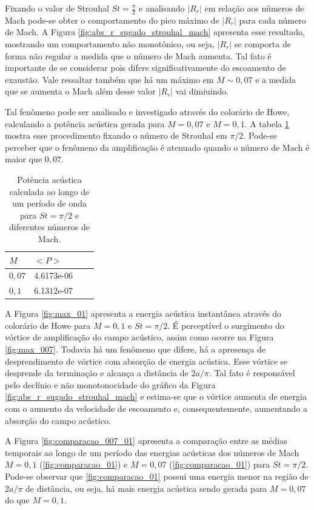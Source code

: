 Fixando o valor de Strouhal $St = \frac{\pi}{2}$ e analisando $|R_{r}|$ em relação aos números de Mach pode-se obter o comportamento do pico máximo de $|R_{r}|$ para cada número de Mach. A Figura \ref{fig:abs_r_sugado_strouhal_mach} apresenta esse resultado, mostrando um comportamento não monotônico, ou seja, $|R_{r}|$ se comporta de forma não regular a medida que o número de Mach aumenta. Tal fato é importante de se considerar pois difere significativamente do escoamento de exaustão. Vale ressaltar também que há um máximo em $M \sim 0,07$ e a medida que se aumenta o Mach além desse valor $|R_{r}|$ vai dimiuindo.

Tal fenômeno pode ser analisado e investigado através do colorário de Howe, calculando a potência acústica gerada para $M = 0,07$ e $M = 0,1$. A tabela \ref{table:potencia_mach} mostra esse procedimento fixando o número de Strouhal em $\pi/2$. Pode-se perceber que o fenômeno da amplificação é atenuado quando o número de Mach é maior que $0,07$.    

\begin{table}[ht!]
\centering
\caption{Potência acústica calculada ao longo de um período de onda para $St = \pi/2$ e diferentes números de Mach.}
\label{table:potencia_mach}
    \begin{tabular}{|l|l|l|l|}
        \hline
        $M$ & $<P>$ \\ \hline
        $0,07$ & 4.6173e-06  \\ \hline  
        $0,1$ & 6.1312e-07 \\ \hline
    \end{tabular}
\end{table}

\newpage

A Figura \ref{fig:max_01} apresenta a energia acústica instantânea através do colorário de Howe para $M = 0,1$ e $St = \pi/2$. É perceptível o surgimento do vórtice de amplificação do campo acústico, assim como ocorre na Figura \ref{fig:max_007}. Todavia há um fenômeno que difere, há a apresença de desprendimento de vórtice com absorção de energia acústica. Esse vórtice se desprende da terminação e alcança a distância de $2a/\pi$. Tal fato é responsável pelo declínio e não monotonocidade do gráfico da Figura \ref{fig:abs_r_sugado_strouhal_mach} e estima-se que o vórtice aumenta de energia com o aumento da velocidade de escoamento e, consequentemente, aumentando a absorção do campo acústico.

A Figura \ref{fig:comparacao_007_01} apresenta a comparação entre as médias temporais ao longo de um período das energias acústicas dos números de Mach $M = 0,1$ (\ref{fig:comparacao_01}) e $M = 0,07$ (\ref{fig:comparacao_01}) para $St = \pi/2$. Pode-se observar que \ref{fig:comparacao_01} possui uma energia menor na região de $2a/\pi$ de distância, ou seja, há mais energia acústica sendo gerada para $M = 0,07$ do que $M = 0,1$.    


